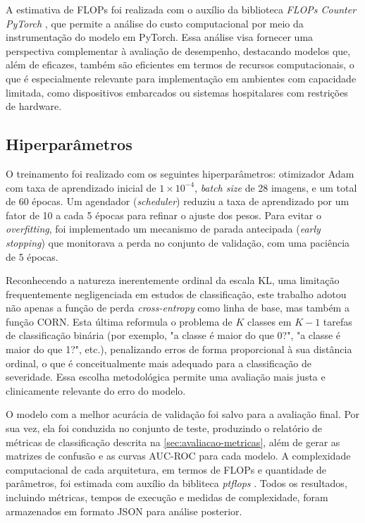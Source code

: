 A estimativa de FLOPs foi realizada com o auxílio da biblioteca \textit{FLOPs Counter PyTorch} \cite{ptflops}, que permite a análise do custo computacional por meio da instrumentação do modelo em PyTorch. Essa análise visa fornecer uma perspectiva complementar à avaliação de desempenho, destacando modelos que, além de eficazes, também são eficientes em termos de recursos computacionais, o que é especialmente relevante para implementação em ambientes com capacidade limitada, como dispositivos embarcados ou sistemas hospitalares com restrições de hardware.

\subsection{Hiperparâmetros}

O treinamento foi realizado com os seguintes hiperparâmetros: otimizador Adam com taxa de aprendizado inicial de $1 \times 10^{-4}$, \textit{batch size} de 28 imagens, e um total de 60 épocas. Um agendador (\textit{scheduler}) reduziu a taxa de aprendizado por um fator de 10 a cada 5 épocas para refinar o ajuste dos pesos. Para evitar o \textit{overfitting}, foi implementado um mecanismo de parada antecipada (\textit{early stopping}) que monitorava a perda no conjunto de validação, com uma paciência de 5 épocas.

Reconhecendo a natureza inerentemente ordinal da escala KL, uma limitação frequentemente negligenciada em estudos de classificação, este trabalho adotou não apenas a função de perda \textit{cross-entropy} como linha de base, mas também a função CORN. Esta última reformula o problema de $K$ classes em $K-1$ tarefas de classificação binária (por exemplo, "a classe é maior do que 0?", "a classe é maior do que 1?", etc.), penalizando erros de forma proporcional à sua distância ordinal, o que é conceitualmente mais adequado para a classificação de severidade. Essa escolha metodológica permite uma avaliação mais justa e clinicamente relevante do erro do modelo.

O modelo com a melhor acurácia de validação foi salvo para a avaliação final. Por sua vez, ela foi conduzida no conjunto de teste, produzindo o relatório de métricas de classificação descrita na \autoref{sec:avaliacao-metricas}, além de gerar as matrizes de confusão e as curvas AUC-ROC para cada modelo. A complexidade computacional de cada arquitetura, em termos de FLOPs e quantidade de parâmetros, foi estimada com auxílio da bibliteca \textit{ptflops} \cite{ptflops}. Todos os resultados, incluindo métricas, tempos de execução e medidas de complexidade, foram armazenados em formato JSON para análise posterior.

